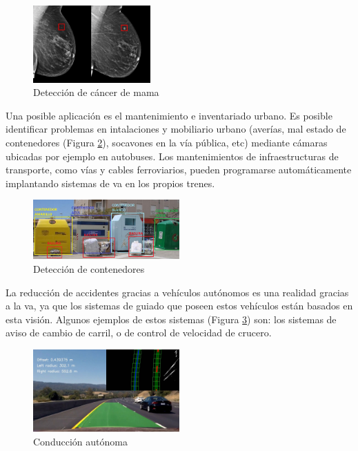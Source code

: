 \begin{figure}[H]
  \begin{center}
    \includegraphics[width=0.4\textwidth]{figures/Introduccion/cancer.png}
		\caption{Detección de cáncer de mama}
		\label{fig.cancer}
		\end{center}
\end{figure}


Una posible aplicación es el mantenimiento e inventariado urbano. Es posible identificar problemas en intalaciones y mobiliario urbano (averías, mal estado de contenedores (Figura \ref{fig.contenedor}), socavones en la vía pública, etc) mediante cámaras ubicadas por ejemplo en autobuses. Los mantenimientos de infraestructuras de transporte, como vías y cables ferroviarios, pueden programarse automáticamente implantando sistemas de \acrshort{va} en los propios trenes. 


\begin{figure}[H]
  \begin{center}
    \includegraphics[width=0.5\textwidth]{figures/Introduccion/contenedor.png}
		\caption{Detección de contenedores}
		\label{fig.contenedor}
		\end{center}
\end{figure}

La reducción de accidentes gracias a vehículos autónomos es una realidad gracias a la \acrshort{va}, ya que los sistemas de guiado que poseen estos vehículos están basados en esta visión. Algunos ejemplos de estos sistemas (Figura \ref{fig.car}) son: los sistemas de aviso de cambio de carril, o de control de velocidad de crucero. 

\begin{figure}[H]
  \begin{center}
    \includegraphics[width=0.5\textwidth]{figures/Introduccion/car.jpg}
		\caption{Conducción autónoma}
		\label{fig.car}
		\end{center}
\end{figure}


